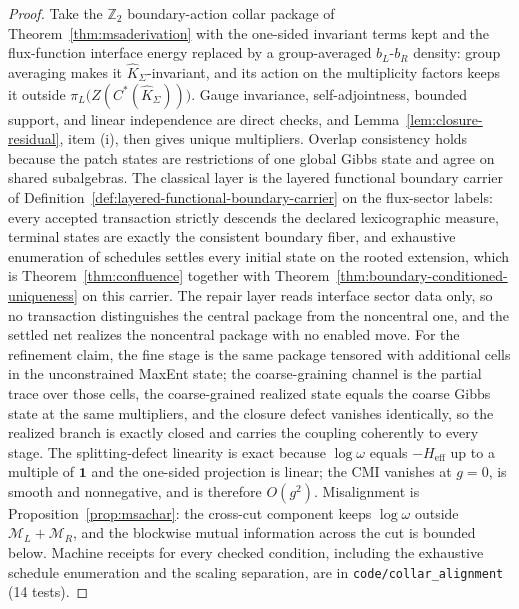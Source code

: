 \documentclass[11pt]{article}
\begin{document}
\begin{proof}
Take the \(\mathbb Z_2\) boundary-action collar package of Theorem~\ref{thm:msaderivation} with the one-sided invariant terms kept and the flux-function interface energy replaced by a group-averaged \(b_L\)-\(b_R\) density: group averaging makes it \(\widehat K_\Sigma\)-invariant, and its action on the multiplicity factors keeps it outside \(\pi_L\bigl(Z(C^*(\widehat K_\Sigma))\bigr)\). Gauge invariance, self-adjointness, bounded support, and linear independence are direct checks, and Lemma~\ref{lem:closure-residual}, item (i), then gives unique multipliers. Overlap consistency holds because the patch states are restrictions of one global Gibbs state and agree on shared subalgebras. The classical layer is the layered functional boundary carrier of Definition~\ref{def:layered-functional-boundary-carrier} on the flux-sector labels: every accepted transaction strictly descends the declared lexicographic measure, terminal states are exactly the consistent boundary fiber, and exhaustive enumeration of schedules settles every initial state on the rooted extension, which is Theorem~\ref{thm:confluence} together with Theorem~\ref{thm:boundary-conditioned-uniqueness} on this carrier. The repair layer reads interface sector data only, so no transaction distinguishes the central package from the noncentral one, and the settled net realizes the noncentral package with no enabled move. For the refinement claim, the fine stage is the same package tensored with additional cells in the unconstrained MaxEnt state; the coarse-graining channel is the partial trace over those cells, the coarse-grained realized state equals the coarse Gibbs state at the same multipliers, and the closure defect vanishes identically, so the realized branch is exactly closed and carries the coupling coherently to every stage. The splitting-defect linearity is exact because \(\log\omega\) equals \(-H_{\mathrm{eff}}\) up to a multiple of \(\mathbf 1\) and the one-sided projection is linear; the CMI vanishes at \(g=0\), is smooth and nonnegative, and is therefore \(O(g^2)\). Misalignment is Proposition~\ref{prop:msachar}: the cross-cut component keeps \(\log\omega\) outside \(\mathcal M_L+\mathcal M_R\), and the blockwise mutual information across the cut is bounded below. Machine receipts for every checked condition, including the exhaustive schedule enumeration and the scaling separation, are in \texttt{code/collar\_alignment} (14 tests).
\end{proof}
\end{document}
